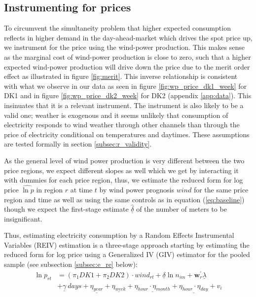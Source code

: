 \subsection{Instrumenting for prices}
\label{subsec:e_instrumenting}
To circumvent the simultaneity problem that higher expected consumption reflects in higher demand in the day-ahead-market which drives the spot price up, we instrument for the price using the wind-power production. This makes sense as the marginal cost of wind-power production is close to zero, such that a higher expected wind-power production will drive down the price due to the merit order effect as illustrated in figure \ref{fig:merit}. This inverse relationship is consistent with what we observe in our data as seen in figure \ref{fig:wp_price_dk1_week} for DK1 and in figure \ref{fig:wp_price_dk2_week} for DK2 (appendix \ref{app:data}). This insinuates that it is a relevant instrument. The instrument is also likely to be a valid one; weather is exogenous and it seems unlikely that consumption of electricity responds to wind weather through other channels than through the price of electricity conditional on temperatures and daytimes. These assumptions are tested formally in section \ref{subsec:r_validity}.
\bigskip\par
As the general level of wind power production is very different between the two price regions, we expect different slopes as well which we get by interacting it with dummies for each price region, thus, we estimate the reduced form for log price $\widehat{\ln p}$ in region $r$ at time $t$ by wind power prognosis $wind$ for the same price region and time as well as using the same controls as in equation (\ref{eq:baseline}) though we expect the first-stage estimate $\widehat{\underline{\delta}}$ of the number of meters to be insignificant.
\par
Thus, estimating electricity consumption by a Random Effects Instrumental Variables (REIV) estimation is a three-stage approach starting by estimating the reduced form for log price using a Generalized IV (GIV) estimator for the pooled sample (see subsection \ref{subsec:e_re} below):
\begin{equation}
  \label{eq:reduced}
  \begin{split}
    \ln p_{rt} &= (\pi_1 DK1+\pi_2 DK2)\cdot wind_{rt} +\underline{\delta}\ln n_{im}+\bm{w}^{'}_{r}\underline{\lambda}\\
  &+\underline{\gamma}\ days+\underline{\eta_{year}}+\underline{\eta_{week}}+\underline{\eta_{hour}\cdot\eta_{month}}+\underline{\eta_{hour}\cdot\eta_{day}}+v_{i}
  \end{split}
\end{equation}
